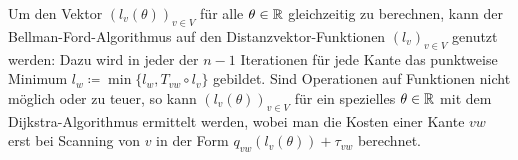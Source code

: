 Um den Vektor $(l_v(\theta))_{v\in V}$ für alle $\theta\in\mathbb{R}$ gleichzeitig zu berechnen, kann der Bellman-Ford-Algorithmus auf den Distanzvektor-Funktionen $(l_v)_{v\in V}$ genutzt werden:
Dazu wird in jeder der $n-1$ Iterationen für jede Kante das punktweise Minimum $l_w \coloneq  \min\{ l_w, T_{vw}\circ l_v \}$ gebildet.
Sind Operationen auf Funktionen nicht möglich oder zu teuer, so kann $(l_v(\theta))_{v\in V}$ für ein spezielles $\theta\in\mathbb{R}$ mit dem Dijkstra-Algorithmus ermittelt werden, wobei man die Kosten einer Kante $vw$ erst bei Scanning von $v$ in der Form $q_{vw}(l_v(\theta)) + \tau_{vw}$ berechnet.